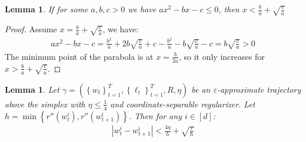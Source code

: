 \documentclass[10pt]{article}
\newtheorem{lemma}[theorem]{Lemma}
\theoremstyle{definition}
\theoremstyle{remark}
\renewcommand{\epsilon}{\varepsilon}
\newcommand{\curly}[1]{ {\left\{ #1 \right\}}}
\newcommand{\abs}[1]{ {\left | #1 \right |}}
\begin{document}
\begin{lemma}\label{lem:solve quadratic}
If for some $a,b,c > 0$ we have $ax^2 - bx - c \le 0$, then $x < \frac{b}{a} + \sqrt{\frac{c}{a}}$
\end{lemma}
\begin{proof}
Assume $x = \frac{b}{a} + \sqrt{\frac{c}{a}}$, we have:
\begin{align*}
    ax^2 - bx - c = \frac{b^2}{a} + 2b\sqrt{\frac{c}{a}} + c - \frac{b^2}{a} - b\sqrt{\frac{c}{a}} - c = b\sqrt{\frac{c}{a}} > 0
\end{align*}
The minimum point of the parabola is at $x = \frac{b}{2a}$, so it only increases for $x > \frac{b}{a} + \sqrt{\frac{c}{a}}$.
\end{proof}

\begin{lemma}\label{lem:max step}
Let $\gamma = (\curly{w_t}_{t=1}^T, \curly{\ell_t}_{t=1}^T, R, \eta)$ be an $\epsilon$-approximate trajectory above the simplex with $\eta \le \frac{1}{4}$ and coordinate-separable regularizer. Let $h=\min\curly{r''(w_t^i), r''(w_{t+1}^i)}$. Then for any $i\in[d]$:
\begin{align*}
    \abs{w_t^i - w_{t+1}^i} < \frac{4\eta}{h} + \sqrt{\frac{\epsilon}{h}}
\end{align*}
\end{lemma}
\end{document}

